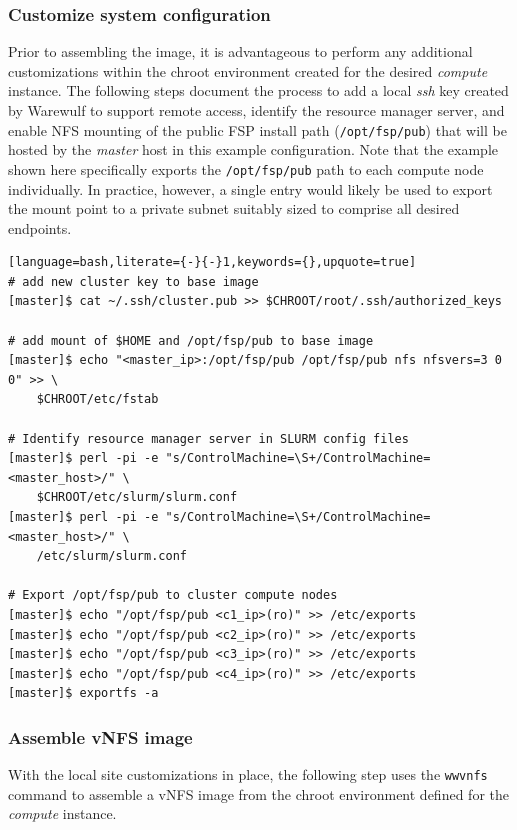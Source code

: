 \documentclass[letterpaper]{article}
\begin{document}
\subsubsection{Customize system configuration} \label{sec:master_customization}

Prior to assembling the image, it is advantageous to perform any additional
customizations within the chroot environment created for the desired {\em
  compute} instance. The following steps document the process to add a local
{\em ssh} key created by Warewulf to support remote access, identify the
resource manager server, and enable NFS mounting of the public FSP
install path (\texttt{/opt/fsp/pub}) that will be hosted by the {\em master}
host in this example configuration. Note that the example shown here
specifically exports the \texttt{/opt/fsp/pub} path to each compute node
individually. In practice, however, a single entry would likely be used to
export the mount point to a private subnet suitably sized to comprise all
desired endpoints. 

\begin{lstlisting}[language=bash,literate={-}{-}1,keywords={},upquote=true]
# add new cluster key to base image
[master]$ cat ~/.ssh/cluster.pub >> $CHROOT/root/.ssh/authorized_keys

# add mount of $HOME and /opt/fsp/pub to base image
[master]$ echo "<master_ip>:/opt/fsp/pub /opt/fsp/pub nfs nfsvers=3 0 0" >> \
    $CHROOT/etc/fstab

# Identify resource manager server in SLURM config files
[master]$ perl -pi -e "s/ControlMachine=\S+/ControlMachine=<master_host>/" \
    $CHROOT/etc/slurm/slurm.conf
[master]$ perl -pi -e "s/ControlMachine=\S+/ControlMachine=<master_host>/" \
    /etc/slurm/slurm.conf

# Export /opt/fsp/pub to cluster compute nodes
[master]$ echo "/opt/fsp/pub <c1_ip>(ro)" >> /etc/exports
[master]$ echo "/opt/fsp/pub <c2_ip>(ro)" >> /etc/exports
[master]$ echo "/opt/fsp/pub <c3_ip>(ro)" >> /etc/exports
[master]$ echo "/opt/fsp/pub <c4_ip>(ro)" >> /etc/exports
[master]$ exportfs -a
\end{lstlisting}


\subsubsection{Assemble vNFS image}

With the local site customizations in place, the following step uses the
\texttt{wwvnfs} command to assemble a vNFS image from the chroot environment
defined for the {\em compute} instance. 
\end{document}
